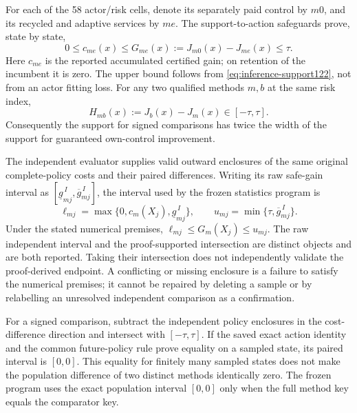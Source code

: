 For each of the 58 actor/risk cells, denote its separately paid control
by \(m0\), and its recycled and adaptive services by \(me\).
The support-to-action safeguards prove, state by state,
\begin{equation}
 0\le c_{me}(x)\le
 G_{me}(x):=J_{m0}(x)-J_{me}(x)\le\tau.
 \label{eq:inference-safe-gain122}
\end{equation}
Here \(c_{me}\) is the reported accumulated certified gain; on retention
of the incumbent it is zero. The upper bound follows from
\eqref{eq:inference-support122}, not from an actor fitting loss.
For any two qualified methods \(m,b\) at the same risk index,
\begin{equation}
 H_{mb}(x):=J_b(x)-J_m(x)\in[-\tau,\tau].
 \label{eq:inference-signed-support122}
\end{equation}
Consequently the support for signed comparisons has twice the width of
the support for guaranteed own-control improvement.

The independent evaluator supplies valid outward enclosures of the
same original complete-policy costs and their paired differences.
Writing its raw safe-gain interval as
\([\underline g^{\,I}_{mj},\overline g^{\,I}_{mj}]\), the interval used by
the frozen statistics program is
\begin{equation}
 \ell_{mj}=
 \max\{0,c_m(X_j),\underline g^{\,I}_{mj}\},\qquad
 u_{mj}=\min\{\tau,\overline g^{\,I}_{mj}\}.
 \label{eq:inference-intersection122}
\end{equation}
Under the stated numerical premises,
\(\ell_{mj}\le G_m(X_j)\le u_{mj}\). The raw independent interval and the
proof-supported intersection are distinct objects and are both
reported. Taking their intersection does not independently validate the
proof-derived endpoint. A conflicting or missing enclosure is a failure
to satisfy the numerical premises; it cannot be repaired by deleting a
sample or by relabelling an unresolved independent comparison as a
confirmation.

For a signed comparison, subtract the independent policy enclosures in
the cost-difference direction and intersect with \([-\tau,\tau]\).
If the saved exact action identity and the common future-policy rule
prove equality on a sampled state, its paired interval is \([0,0]\).
This equality for finitely many sampled states does not make the
population difference of two distinct methods identically zero.
The frozen program uses the exact population interval \([0,0]\) only
when the full method key equals the comparator key.

